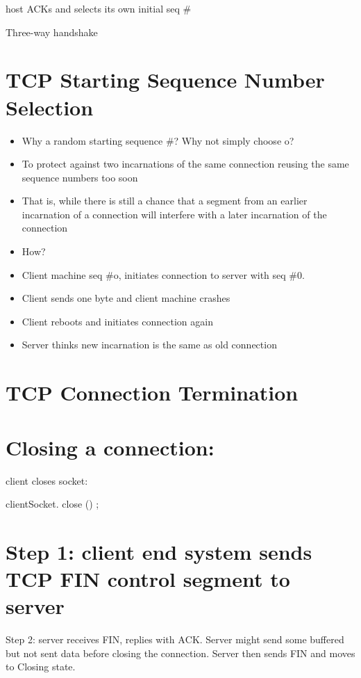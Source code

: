 \documentclass[10pt]{article}
\begin{document}
host ACKs and selects its own initial seq \#

Three-way handshake

\section{TCP Starting Sequence Number Selection}
\begin{itemize}
  \item Why a random starting sequence \#? Why not simply choose o?

  \item To protect against two incarnations of the same connection reusing the same sequence numbers too soon

  \item That is, while there is still a chance that a segment from an earlier incarnation of a connection will interfere with a later incarnation of the connection

  \item How?

  \item Client machine seq \#o, initiates connection to server with seq \#0.

  \item Client sends one byte and client machine crashes

  \item Client reboots and initiates connection again

  \item Server thinks new incarnation is the same as old connection

\end{itemize}

\section{TCP Connection Termination}
\section{Closing a connection:}
client closes socket:

clientSocket. close () ;

\section{Step 1: client end system sends TCP FIN control segment to server}
Step 2: server receives FIN, replies with $\mathrm{ACK}$. Server might send some buffered but not sent data before closing the connection. Server then sends FIN and moves to Closing state.
\end{document}
